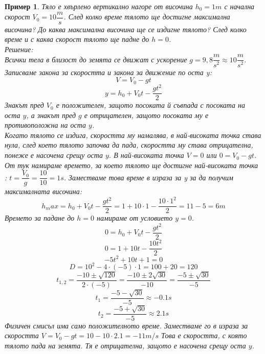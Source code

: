 \documentclass[fleqn]{article}
\newtheorem{example}{Пример}[subsection]
\begin{document}
\begin{example}
Тяло е хвърлено вертикално нагоре от височина $h_0 = 1m$ с начална скорост $V_0 = 10 \dfrac{m}{s}$. След колко време тялото ще достигне максимална височина? До каква максимална височина ще се издигне тялото? След колко време и с каква скорост тялото ще падне до $h = 0$. \\
Решение: \\
Всички тела в близост до земята се движат с ускорение $g = 9,8 \dfrac{m}{s^2} \approx 10 \dfrac{m}{s^2}$. \\
Записваме закона за скоростта и закона за движение по оста y:
$$V = V_0 - gt$$
$$y = h_0 + V_0t - \dfrac{gt^2}{2}$$
Знакът пред $V_0$ е положителен, защото посоката й съвпада с посоката на оста $y$, а знакът пред $g$ е отрицателен, защото посоката му е противоположна на оста $y$.\\
Когато тялото се издига, скоростта му намалява, в най-високата точка става нула, след което тялото започва да пада, скоростта му става отрицателна, понеже е насочена срещу оста $y$. В най-високата точка $V = 0$  или $0 = V_0 - gt$. От тук намираме времето, за което тялото ще достигне най-високата точка : $t = \dfrac{V_0}{g} = \dfrac{10}{10} = 1s$. Заместваме това време в израза за y за да получим максималната височина:
$$h_max = h_0 + V_0t -  \dfrac{gt^2}{2} = 1+ 10 \cdot 1 -  \dfrac{10 \cdot 1^2}{2} = 11 - 5 = 6m$$
Времето за падане до $h = 0$  намираме от условието $y = 0$.
$$0 = h_0 + V_0t - \dfrac{gt^2}{2} $$
$$0 = 1 + 10t -  \dfrac{10t^2}{2}$$
$$-5t^2 + 10t  + 1 = 0 $$
$$D = 10^2 - 4 \cdot (-5) \cdot 1 = 100 + 20 = 120 $$
$$t_{1,2} = \dfrac{-10 \pm \sqrt{120}}{2 \cdot (-5)} = \dfrac{-10 \pm 2\sqrt{30}}{-10} = \dfrac{-5 \pm \sqrt{30}}{-5}$$
$$t_1 = \dfrac{-5 -\sqrt{30}}{-5} \approx -0.1 s$$
$$t_2 = \dfrac{-5 +\sqrt{30}}{-5} \approx 2.1 s$$
Физичен смисъл има само положителното време. Заместваме го в израза за скоростта $V = V_0 - gt = 10 - 10 \cdot 2.1 = -11 m/s$ Това е скоростта, с която тялото пада на земята. Тя е отрицателна, защото е насочена срещу оста $y$.
\end{example}
\end{document}
